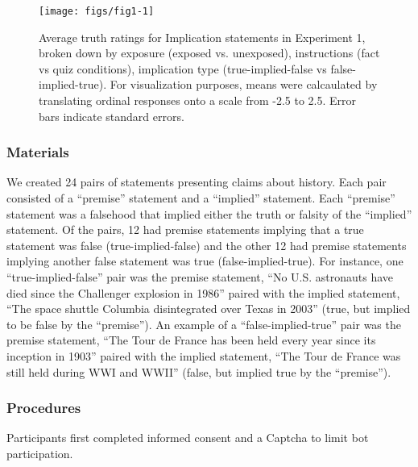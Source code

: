 \documentclass[10pt, letterpaper]{article}
\newenvironment{CodeChunk}{}{}
\begin{document}
\begin{CodeChunk}
\begin{figure}[h]

{\centering \texttt{[image: figs/fig1-1]} 

}

\caption[Average truth ratings for Implication statements in Experiment 1, broken down by exposure (exposed vs]{Average truth ratings for Implication statements in Experiment 1, broken down by exposure (exposed vs. unexposed), instructions (fact vs quiz conditions), implication type (true-implied-false vs false-implied-true). For visualization purposes, means were calcaulated by translating ordinal responses onto a scale from -2.5 to 2.5. Error bars indicate standard errors. }\label{fig:fig1}
\end{figure}
\end{CodeChunk}

\hypertarget{materials}{%
\subsubsection{Materials}\label{materials}}

We created 24 pairs of statements presenting claims about history. Each
pair consisted of a ``premise'' statement and a ``implied'' statement.
Each ``premise'' statement was a falsehood that implied either the truth
or falsity of the ``implied'' statement. Of the pairs, 12 had premise
statements implying that a true statement was false (true-implied-false)
and the other 12 had premise statements implying another false statement
was true (false-implied-true). For instance, one ``true-implied-false''
pair was the premise statement, ``No U.S. astronauts have died since the
Challenger explosion in 1986'' paired with the implied statement, ``The
space shuttle Columbia disintegrated over Texas in 2003'' (true, but
implied to be false by the ``premise''). An example of a
``false-implied-true'' pair was the premise statement, ``The Tour de
France has been held every year since its inception in 1903'' paired
with the implied statement, ``The Tour de France was still held during
WWI and WWII'' (false, but implied true by the ``premise'').

\hypertarget{procedures}{%
\subsubsection{Procedures}\label{procedures}}

Participants first completed informed consent and a Captcha to limit bot
participation.
\end{document}
